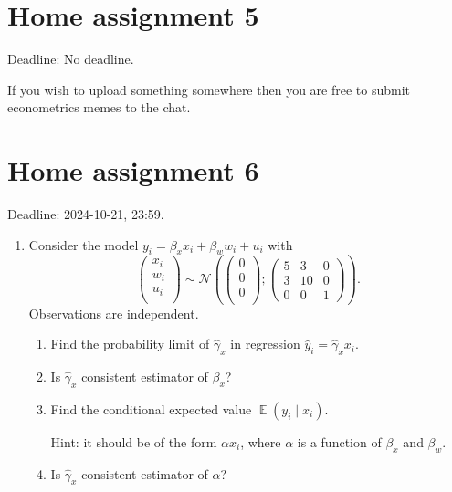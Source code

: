 \documentclass[12pt]{article}
\DeclareMathOperator{\E}{\mathbb{E}}
\newcommand \cN{\mathcal{N}}
\begin{document}
\section*{Home assignment 5}

Deadline: No deadline. 

If you wish to upload something somewhere then you are free to submit econometrics memes to the chat. 


\section*{Home assignment 6}

Deadline: 2024-10-21, 23:59.

\begin{enumerate}
    \item Consider the model $y_i = \beta_x x_i + \beta_w w_i + u_i$ with
    \[
    \begin{pmatrix}
        x_i \\
        w_i \\
        u_i \\
    \end{pmatrix} \sim \cN\left(
        \begin{pmatrix}
            0 \\
            0 \\
            0 \\
        \end{pmatrix};
    \begin{pmatrix}
        5 & 3 & 0 \\
        3 & 10 & 0 \\
        0 & 0 & 1
    \end{pmatrix}
    \right).
    \]
    Observations are independent. 
    \begin{enumerate}
        \item Find the probability limit of $\hat \gamma_x$ in regression $\hat y_i = \hat \gamma_x x_i$.
        \item Is $\hat \gamma_x$ consistent estimator of $\beta_x$?
        \item Find the conditional expected value $\E(y_i \mid x_i)$.
        
        Hint: it should be of the form $\alpha x_i$, where $\alpha$ is a function of $\beta_x$ and $\beta_w$.
        \item Is $\hat \gamma_x$ consistent estimator of $\alpha$? 
    \end{enumerate}


\end{enumerate}
\end{document}
